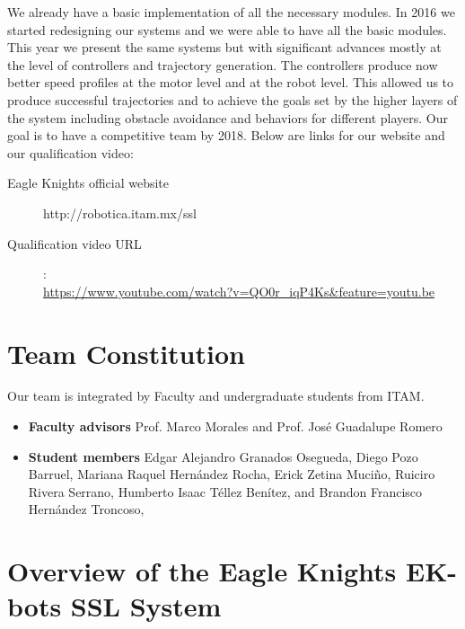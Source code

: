 \documentclass[]{llncs}
\newcommand{\TODO}[1]{{\textcolor{blue}{ToDo: {#1}}}}
\begin{document}
We already have a basic implementation of all the necessary modules. In 2016 we started redesigning our systems and we were able to have all the basic modules. This year we present the same systems but with significant advances mostly at the level of controllers and trajectory generation. The controllers produce now better speed profiles at the motor level and at the robot level. This allowed us to produce successful trajectories and to achieve the goals set by the higher layers of the system including obstacle avoidance and behaviors for different players. Our goal is to have a competitive team by 2018. Below are links for our website and our qualification video:
\begin{description}
	\item[Eagle Knights official website] http://robotica.itam.mx/ssl
	\item[Qualification video URL]:\\ \url{https://www.youtube.com/watch?v=QO0r_iqP4Ks&feature=youtu.be} %
\end{description}


\section{Team Constitution}

Our team is integrated by Faculty and undergraduate students from ITAM.
\begin{itemize}
\item {\bf Faculty advisors} 
Prof. Marco Morales and
Prof. José Guadalupe Romero
\item {\bf Student members} 
Edgar Alejandro Granados Osegueda,
Diego Pozo Barruel,
Mariana Raquel Hernández Rocha,
Erick Zetina Muciño,
Ruiciro Rivera Serrano,
Humberto Isaac Téllez Benítez, and
Brandon Francisco Hernández Troncoso,
\end{itemize}


\section{Overview of the Eagle Knights EK-bots SSL System }
\end{document}
